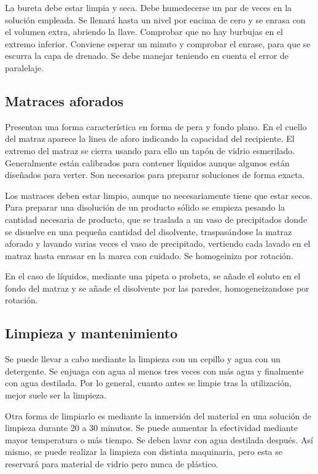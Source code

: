 La bureta debe estar limpia y seca. Debe humedecerse un par de veces en la solución empleada. Se llenará hasta un nivel por encima de cero y se enrasa con el volumen extra, abriendo la llave. Comprobar que no hay burbujas en el extremo inferior. Conviene esperar un minuto y comprobar el enrase, para que se escurra la capa de drenado. Se debe manejar teniendo en cuenta el error de paralelaje.
\subsection{Matraces aforados}
Presentan una forma característica en forma de pera y fondo plano. En el cuello del matraz aparece la linea de aforo indicando la capacidad del recipiente. El extremo del matraz se cierra usando para ello un tapón de vidrio esmerilado. Generalmente están calibrados para contener líquidos aunque algunos están diseñados para verter. Son necesarios para preparar soluciones de forma exacta.

Los matraces deben estar limpio, aunque no necesariamente tiene que estar secos. Para preparar una disolución de un producto sólido se empieza pesando la cantidad necesaria de producto, que se traslada a un vaso de precipitados donde se disuelve en una pequeña cantidad del disolvente, traspasándose la matraz aforado y lavando varias veces el vaso de precipitado, vertiendo cada lavado en el matraz hasta enrasar en la marca con cuidado. Se homogeiniza por rotación.

En el caso de líquidos, mediante una pipeta o probeta, se añade el soluto en el fondo del matraz y se añade el disolvente por las paredes, homogeneizandose por rotación.
\subsection{Limpieza y mantenimiento}
Se puede llevar a cabo mediante la limpieza con un cepillo y agua con un detergente. Se enjuaga con agua al menos tres veces con más agua y finalmente con agua destilada. Por lo general, cuanto antes se limpie tras la utilización, mejor suele ser la limpieza.

Otra forma de limpiarlo es mediante la inmersión del material en una solución de limpieza durante 20 a 30 minutos. Se puede aumentar la efectividad mediante mayor temperatura o más tiempo. Se deben lavar con agua destilada después. Así mismo, se puede realizar la limpieza con distinta maquinaria, pero esta se reservará para material de vidrio pero nunca de plástico.

